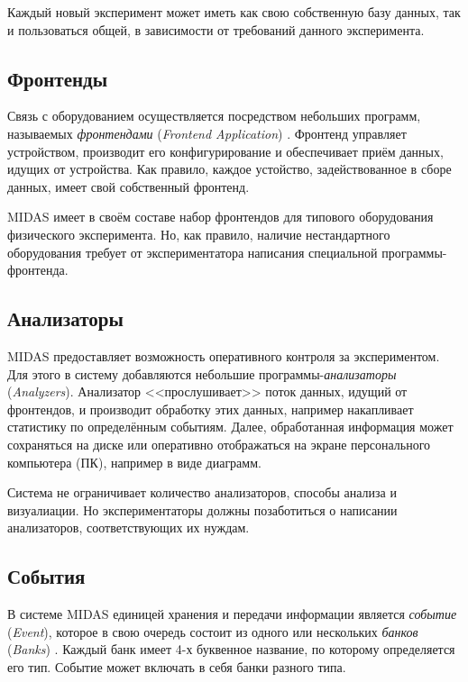 \documentclass[12pt, a4paper, oneside, onecolumn]{book}
\newcommand{\MIDAS}{\mbox{MIDAS}}
\newcommand{\TERM}[1]{{\it #1}}
\begin{document}
Каждый новый эксперимент может иметь как свою собственную базу данных, так и пользоваться общей, в зависимости от требований данного эксперимента.

\subsection{Фронтенды}
\label{sec-midas-frontend}

Связь с оборудованием осуществляется посредством небольших программ, называемых \TERM{фронтендами} (\TERM{Frontend Application}) \cite{MidasWikiFrontend}. Фронтенд управляет устройством, производит его конфигурирование и обеспечивает приём данных, идущих от устройства. Как правило, каждое устойство, задействованное в сборе данных, имеет свой собственный фронтенд.

\MIDAS{} имеет в своём составе набор фронтендов для типового оборудования физического эксперимента. Но, как правило, наличие нестандартного оборудования требует от экспериментатора написания специальной программы-фронтенда.

\subsection{Анализаторы}
\label{sec-midas-analyzer}

\MIDAS{} предоставляет возможность оперативного контроля за экспериментом. Для этого в систему добавляются небольшие программы-\TERM{анализаторы} (\TERM{Analyzers}). Анализатор <<прослушивает>> поток данных, идущий от фронтендов, и производит обработку этих данных, например накапливает статистику по определённым событиям. Далее, обработанная информация может сохраняться на диске или оперативно отображаться на экране персонального компьютера (ПК), например в виде диаграмм.

Система не ограничивает количество анализаторов, способы анализа и визуалиации. Но экспериментаторы должны позаботиться о написании анализаторов, соответствующих их нуждам.

\subsection{События}
\label{sec-midas-event}

В системе \MIDAS{} единицей хранения и передачи информации является \TERM{событие} (\TERM{Event}), которое в свою очередь состоит из одного или нескольких \TERM{банков} (\TERM{Banks}) \cite{MidasWikiEvent}. Каждый банк имеет 4-х буквенное название, по которому определяется его тип. Событие может включать в себя банки разного типа.
\end{document}
